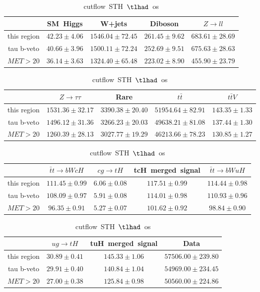 \begin{table}
\caption{cutflow~STH~$\tlhad$~os}
\centering
\begin{tabular}{|c|c|c|c|c|} \hline
 & SM~Higgs & W+jets & Diboson & $Z\to ll$\\\hline
this region & $42.23\pm4.06$ & $1546.04\pm72.45$ & $261.45\pm9.62$ & $683.61\pm28.69$\\\hline
tau b-veto & $40.66\pm3.96$ & $1500.11\pm72.24$ & $252.69\pm9.51$ & $675.63\pm28.63$\\\hline
$MET>20$ & $36.14\pm3.63$ & $1324.40\pm65.48$ & $223.02\pm8.90$ & $455.90\pm23.79$\\\hline
\end{tabular}
\begin{tabular}{|c|c|c|c|c|} \hline
 & $Z\to \tau\tau$ & Rare & $t\bar{t}$ & $t\bar{t}V$\\\hline
this region & $1531.36\pm32.17$ & $3390.38\pm20.40$ & $51954.64\pm82.91$ & $143.35\pm1.33$\\\hline
tau b-veto & $1496.12\pm31.36$ & $3266.23\pm20.03$ & $49638.21\pm81.08$ & $137.44\pm1.30$\\\hline
$MET>20$ & $1260.39\pm28.13$ & $3027.77\pm19.29$ & $46213.66\pm78.23$ & $130.85\pm1.27$\\\hline
\end{tabular}
\begin{tabular}{|c|c|c|c|c|} \hline
 & $\bar{t}t\to bWcH$ & $cg\to tH$ & tcH~merged~signal & $\bar{t}t\to bWuH$\\\hline
this region & $111.45\pm0.99$ & $6.06\pm0.08$ & $117.51\pm0.99$ & $114.44\pm0.98$\\\hline
tau b-veto & $108.09\pm0.97$ & $5.91\pm0.08$ & $114.01\pm0.98$ & $110.93\pm0.96$\\\hline
$MET>20$ & $96.35\pm0.91$ & $5.27\pm0.07$ & $101.62\pm0.92$ & $98.84\pm0.90$\\\hline
\end{tabular}
\begin{tabular}{|c|c|c|c|} \hline
 & $ug\to tH$ & tuH~merged~signal & Data\\\hline
this region & $30.89\pm0.41$ & $145.33\pm1.06$ & $57506.00\pm239.80$\\\hline
tau b-veto & $29.91\pm0.40$ & $140.84\pm1.04$ & $54969.00\pm234.45$\\\hline
$MET>20$ & $27.00\pm0.38$ & $125.84\pm0.98$ & $50560.00\pm224.86$\\\hline
\end{tabular}
\label{tab:cutflow_reg1l1tau1b2j_os}
\end{table}
